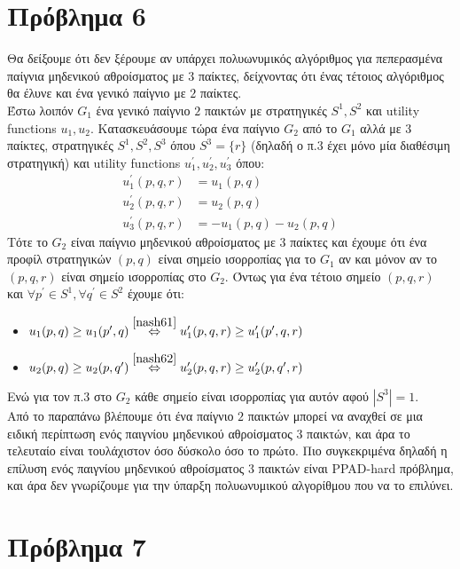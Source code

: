 \documentclass[a4paper,11pt]{article}
\begin{document}
\newpage


\section*{Πρόβλημα 6}

Θα δείξουμε ότι δεν ξέρουμε αν υπάρχει πολυωνυμικός αλγόριθμος για πεπερασμένα παίγνια μηδενικού αθροίσματος με $3$ παίκτες, δείχνοντας ότι ένας τέτοιος αλγόριθμος θα έλυνε και ένα γενικό παίγνιο με $2$ παίκτες.
\\[8pt]
Έστω λοιπόν $G_1$ ένα γενικό παίγνιο $2$ παικτών με στρατηγικές $S^1,S^2$ και utility functions $u_1, u_2$.
Κατασκευάσουμε τώρα ένα παίγνιο $G_2$ από το $G_1$ αλλά με $3$ παίκτες, στρατηγικές $S^1,S^2,S^3$ όπου $S^3 = \{r\}$ (δηλαδή ο π.3 έχει μόνο μία διαθέσιμη στρατηγική) και utility functions $u_1^\prime, u_2^\prime, u_3^\prime$ όπου:
\begin{align}
  u_1^\prime(p,q,r) &= u_1(p,q) \label{nash61}\\
  u_2^\prime(p,q,r) &= u_2(p,q) \label{nash62}\\
  u_3^\prime(p,q,r) &= -u_1(p,q)-u_2(p,q) \nonumber
\end{align}
Τότε το $G_2$ είναι παίγνιο μηδενικού αθροίσματος με $3$ παίκτες και έχουμε ότι ένα προφίλ στρατηγικών $(p,q)$ είναι σημείο ισορροπίας για το $G_1$ αν και μόνον αν το $(p,q,r)$ είναι σημείο ισορροπίας στο $G_2$.
Όντως για ένα τέτοιο σημείο $(p,q,r)$ και $\forall p^\prime \in S^1, \forall q^\prime \in S^2$ έχουμε ότι:
\begin{itemize}
	\item $u_1(p,q) \geq u_1(p^\prime,q) \stackrel{\eqref{nash61}}{\Leftrightarrow} u_1^\prime(p,q,r) \geq u_1^\prime(p^\prime,q,r)$
	\item $u_2(p,q) \geq u_2(p,q^\prime) \stackrel{\eqref{nash62}}{\Leftrightarrow} u_2^\prime(p,q,r) \geq u_2^\prime(p,q^\prime,r)$
\end{itemize}
Ενώ για τον π.3 στο $G_2$ κάθε σημείο είναι ισορροπίας για αυτόν αφού $|S^3|=1$.
\\[8pt]
Από το παραπάνω βλέπουμε ότι ένα παίγνιο $2$ παικτών μπορεί να αναχθεί σε μια ειδική περίπτωση ενός παιγνίου μηδενικού αθροίσματος $3$ παικτών, και άρα το τελευταίο είναι τουλάχιστον όσο δύσκολο όσο το πρώτο.
Πιο συγκεκριμένα δηλαδή η επίλυση ενός παιγνίου μηδενικού αθροίσματος $3$ παικτών είναι PPAD-hard πρόβλημα, και άρα δεν γνωρίζουμε για την ύπαρξη πολυωνυμικού αλγορίθμου που να το επιλύνει.


\section*{Πρόβλημα 7}
\end{document}
